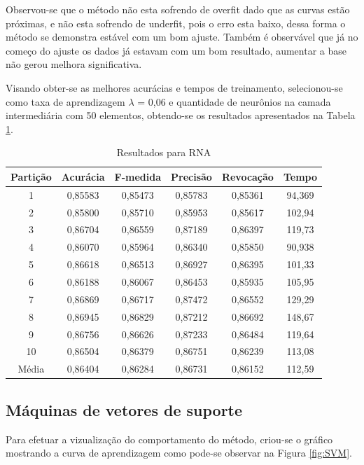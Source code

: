 Observou-se que o método não esta sofrendo de overfit dado que as curvas estão próximas, e não esta sofrendo de underfit, pois o erro esta baixo, dessa forma o método se demonstra estável com um bom ajuste. Também é observável que já no começo do ajuste os dados já estavam com um bom resultado, aumentar a base não gerou melhora significativa.

Visando obter-se as melhores acurácias e tempos de treinamento, selecionou-se como taxa de aprendizagem \(\lambda\) = 0,06 e quantidade de neurônios na camada intermediária com 50 elementos, obtendo-se os resultados apresentados na Tabela \ref{table:resultadosRNA}.
	
	
\begin{table}[h]
\centering
\caption{Resultados para RNA}
\vspace{0.2cm}
\begin{tabular}{c|c|c|c|c|c}
Partição & Acurácia & F-medida & Precisão & Revocação & Tempo \\
\hline
1  & 0,85583 & 0,85473 & 0,85783 & 0,85361 & 94,369 \\
2  & 0,85800 & 0,85710 & 0,85953 & 0,85617 & 102,94 \\
3  & 0,86704 & 0,86559 & 0,87189 & 0,86397 & 119,73 \\
4  & 0,86070 & 0,85964 & 0,86340 & 0,85850 & 90,938 \\
5  & 0,86618 & 0,86513 & 0,86927 & 0,86395 & 101,33 \\
6  & 0,86188 & 0,86067 & 0,86453 & 0,85935 & 105,95 \\
7  & 0,86869 & 0,86717 & 0,87472 & 0,86552 & 129,29 \\
8  & 0,86945 & 0,86829 & 0,87212 & 0,86692 & 148,67 \\
9  & 0,86756 & 0,86626 & 0,87233 & 0,86484 & 119,64 \\
10 & 0,86504 & 0,86379 & 0,86751 & 0,86239 & 113,08 \\
\hline
Média & 0,86404 & 0,86284 & 0,86731 & 0,86152 & 112,59 \\
\end{tabular} 
\label{table:resultadosRNA}
\end{table}

\subsection{Máquinas de vetores de suporte}
	
Para efetuar a vizualização do comportamento do método, criou-se o gráfico mostrando a curva de aprendizagem como pode-se observar na Figura \ref{fig:SVM}.

